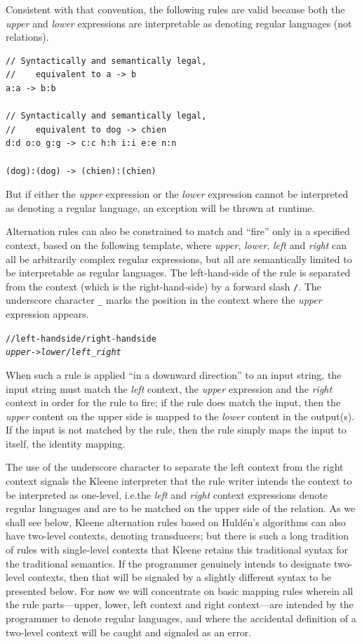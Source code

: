 Consistent with that convention, the following rules are valid because both the \emph{upper} and
\emph{lower} expressions are interpretable as denoting regular languages (not relations).

\begin{Verbatim}
// Syntactically and semantically legal, 
//    equivalent to a -> b
a:a -> b:b

// Syntactically and semantically legal, 
//    equivalent to dog -> chien
d:d o:o g:g -> c:c h:h i:i e:e n:n

(dog):(dog) -> (chien):(chien)
\end{Verbatim}

\noindent
But if either the \emph{upper} expression or the \emph{lower} expression cannot be interpreted as
denoting a regular language, an exception will be thrown at runtime.

Alternation rules can also be constrained to match and ``fire'' only in a specified context, based on the following
template, where \emph{upper}, \emph{lower}, \emph{left} and \emph{right} can all be arbitrarily complex regular
expressions, but all are semantically limited to be interpretable as regular languages.  The left-hand-side of the rule
is separated from the context (which is the right-hand-side) by a forward slash \texttt{/}. The underscore character
\texttt{\_} marks the position in the context where the \emph{upper} expression appears.
 

\begin{alltt}
// left-hand side / right-hand side
\emph{upper} -> \emph{lower} / \emph{left} _ \emph{right}
\end{alltt}

\noindent
When such a rule is applied ``in a downward direction'' to an input string, the input string must match the \emph{left}
context, the \emph{upper} expression and the \emph{right} context in order for the rule to fire; if the rule does match the input, then the
\emph{upper} content on the upper side is mapped to the \emph{lower} content in the output(s).  If the
input is not matched by the rule, then the rule simply maps the input to itself, the identity mapping.


The use of the underscore character to separate the left context from the right context signals the
Kleene interpreter that the rule writer intends the context to be interpreted as one-level, i.e.\@ the
\emph{left} and \emph{right} context expressions denote regular languages and are to be matched on the upper
side of the relation.  As we shall see below, Kleene alternation rules based on Huldén's algorithms can
also have two-level contexts, denoting transducers; but there is such a long tradition of rules with
single-level contexts that Kleene retains this traditional syntax for the traditional semantics.  If
the programmer genuinely intends to designate two-level contexts, then that will be signaled by a
slightly different syntax to be presented below.  For now we will concentrate on basic mapping rules
wherein all the rule parts---upper, lower, left context and right context---are intended
by the programmer
to denote regular languages, and where the accidental definition of a two-level context will be caught
and signaled as an error.

